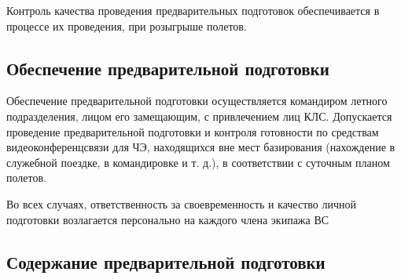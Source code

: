 Контроль качества проведения предварительных подготовок обеспечивается в процессе их проведения, при розыгрыше полетов.

\subsection{Обеспечение предварительной подготовки}
\setcounter{subsect}{1}

Обеспечение предварительной подготовки осуществляется командиром летного подразделения, лицом его замещающим, с привлечением лиц КЛС.
Допускается проведение предварительной подготовки и контроля готовности по средствам видеоконференцсвязи для ЧЭ, находящихся вне мест базирования (нахождение в служебной поездке, в командировке и т. д.), в соответствии с суточным планом полетов.

Во всех случаях, ответственность за своевременность и качество личной подготовки возлагается персонально на каждого члена экипажа ВС

\subsection{Содержание предварительной подготовки}
\setcounter{subsect}{1}

